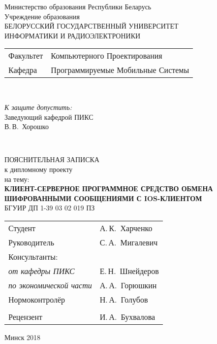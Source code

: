 \begin{titlepage}
  \begin{center}
    Министерство образования Республики Беларусь\\[1em]
    Учреждение образования\\
    БЕЛОРУССКИЙ ГОСУДАРСТВЕННЫЙ УНИВЕРСИТЕТ \\
    ИНФОРМАТИКИ И РАДИОЭЛЕКТРОНИКИ\\[1em]

    \begin{minipage}{\textwidth}
      \begin{flushleft}
        \begin{tabular}{ l l }
          Факультет & Компьютерного Проектирования\\
          Кафедра   & Программируемые Мобильные Системы
        \end{tabular}
      \end{flushleft}
    \end{minipage}\\[3em]

    \begin{flushright}
      \begin{minipage}{0.4\textwidth}
        \textit{К защите допустить:}\\[0.8em]
        Заведующий кафедрой ПИКС\\[0.45em]
        \underline{\hspace*{2.8cm}} В.\,В.~Хорошко
      \end{minipage}\\[2.2em]
    \end{flushright}

    {ПОЯСНИТЕЛЬНАЯ ЗАПИСКА}\\
    {к дипломному проекту}\\
    {на тему:}\\[1em]
    \textbf{\large\MakeUppercase{Клиент-серверное программное средство обмена шифрованными сообщениями с iOS-клиентом}}\\[1em]


    {БГУИР ДП 1-39 03 02 019 ПЗ}\\[2em]
    
    \begin{tabular}{ p{}p{} }
      Студент & А.\,К.~Харченко \\
      Руководитель & С.\,А.~Мигалевич \\
      Консультанты: &\\
      \hspace*{3ex}\emph{от кафедры ПИКС} & Е.\,Н.~Шнейдеров \\
      \hspace*{3ex}\emph{по экономической части} & А.\,А.~Горюшкин \\
      Нормоконтролёр & Н.\,А.~Голубов\\
      & \\
      Рецензент & И.\,А.~Бухвалова\\
    \end{tabular}
    
    \vfill
    {\normalsize Минск 2018}
  \end{center}
\end{titlepage}

